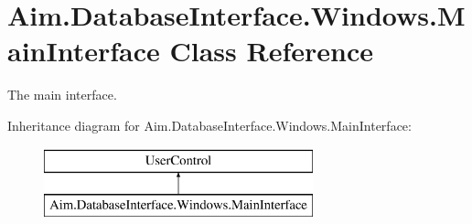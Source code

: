 \hypertarget{class_aim_1_1_database_interface_1_1_windows_1_1_main_interface}{}\section{Aim.\+Database\+Interface.\+Windows.\+Main\+Interface Class Reference}
\label{class_aim_1_1_database_interface_1_1_windows_1_1_main_interface}


The main interface.  


Inheritance diagram for Aim.\+Database\+Interface.\+Windows.\+Main\+Interface\+:\begin{figure}[H]
\begin{center}
\leavevmode
\includegraphics[height=2.000000cm]{class_aim_1_1_database_interface_1_1_windows_1_1_main_interface}
\end{center}
\end{figure}
